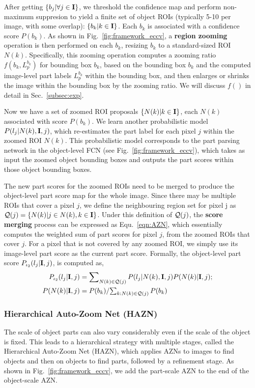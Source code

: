 After getting $\{b_j |\forall j\in{\mathbf I}\}$, we threshold the confidence map and perform non-maximum suppresion to yield a finite set of object ROIs (typically 5-10 per image, with some overlap): $\{b_k | k \in {\mathbf I}\}$. Each $b_k$ is associated with a confidence score $P(b_k)$. As shown in Fig.~\ref{fig:framework_eccv}, a \textbf{region zooming} operation is then performed on each $b_k$, resizing $b_k$ to a standard-sized ROI $N(k)$. Specifically, this zooming operation computes a zooming ratio $f(b_k, L^{b_k}_p)$ for bounding box $b_k$, based on the bounding box $b_k$ and the computed image-level part labels $L^{b_k}_p$ within the bounding box, and then enlarges or shrinks the image within the bounding box by the zooming ratio. We will discuss $f()$ in detail in Sec.~\ref{subsec:exp}.

Now we have a set of zoomed ROI proposals $\{N(k)|k\in{\mathbf I}\}$, each $N(k)$ associated with score $P(b_k)$. We learn another probabilistic model $P(l_j | N(k), {\mathbf I}, j)$, which re-estimates the part label for each pixel $j$ within the zoomed ROI $N(k)$. This probabilistic model corresponds to the part parsing network in the object-level FCN (see Fig.~\ref{fig:framework_eccv}), which takes as input the zoomed object bounding boxes and outputs the part scores within those object bounding boxes.

The new part scores for the zoomed ROIs need to be merged to produce the object-level part score map for the whole image. Since there may be multiple ROIs that cover a pixel $j$, we define the neighbouring region set for pixel j as ${\mathcal Q}(j)=\{N(k) | j \in N(k), k \in {\mathbf I}\}$. Under this definition of ${\mathcal Q}(j)$, the \textbf{score merging} process can be expressed as Equ.~\ref{eqn:AZN}, which essentially computes the weighted sum of part scores for pixel $j$, from the zoomed ROIs that cover $j$. For a pixel that is not covered by any zoomed ROI, we simply use its image-level part score as the current part score. Formally, the object-level part score $P_{\iota_2}(l_j|{\mathbf I}, j)$, is computed as, 
\begin{align}
P_{\iota_2}(l_j|{\mathbf I}, j) &= \sum\nolimits_{N(k) \in {\mathcal Q}(j)} P(l_j | N(k), {\mathbf I}, j) P(N(k) | {\mathbf I}, j);  \nonumber \\
P(N(k) | {\mathbf I}, j) &= P(b_k) / \textstyle{\sum_{k: N(k) \in {\mathcal Q}(j)} P(b_k)}
\label{eqn:AZN}
\end{align}

\subsubsection{Hierarchical Auto-Zoom Net (HAZN)}
The scale of object parts can also vary considerably even if the scale of the object is fixed. This leads to a hierarchical strategy with multiple stages,
called the Hierarchical Auto-Zoom Net (HAZN), which applies AZNs to images to find objects and then on objects to find parts, followed by a refinement stage.
As shown in Fig.~\ref{fig:framework_eccv}, we add the part-scale AZN to the end of the object-scale AZN.

